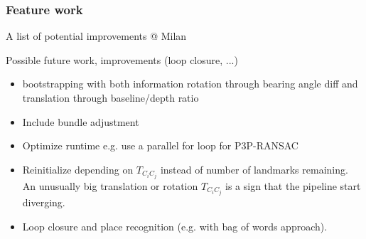 \subsubsection{Feature work}
A list of potential improvements
@ Milan

Possible future work, improvements (loop closure, ...)

\begin{itemize}
\item \colorbox[rgb]{1,0,0}{bootstrapping with both information rotation through bearing angle diff and translation through baseline/depth ratio}
\item Include bundle adjustment
\item Optimize runtime e.g. use a parallel for loop for P3P-RANSAC
\item Reinitialize depending on $T_{C_iC_j}$ instead of number of landmarks remaining. An unusually big translation or rotation $T_{C_iC_j}$ is a sign that the pipeline start diverging.
\item Loop closure and place recognition (e.g. with bag of words approach).
\end{itemize}
